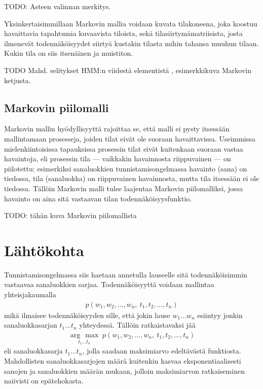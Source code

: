 \documentclass[utf8,bachelor,manualbib]{gradu3}
\newcommand{\argmax}[1]{\underset{#1}{\operatorname{arg}\,\operatorname{max}}\;}
\begin{document}
TODO: Asteen valinnan merkitys.

Yksinkertaisimmillaan Markovin mallia voidaan kuvata tilakoneena, joka koostuu havaittavia tapahtumia kuvaavista tiloista, sekä tilasiirtymämatriisista, josta ilmenevät todennäköisyydet siirtyä kustakin tilasta mihin tahansa muuhun tilaan. Kukin tila on siis itsenäinen ja muistiton.

TODO Mahd. selitykset HMM:n viidestä elementistä \citep{rabiner1989}, esimerkkikuva Markovin ketjusta.


\subsection{Markovin piilomalli}

Markovin mallin hyödyllisyyttä rajoittaa se, että malli ei pysty itsessään mallintamaan prosesseja, joiden tilat eivät ole suoraan havaittavissa. Useimmissa mielenkiintoisissa tapauksissa prosessin tilat eivät kuitenkaan suoraan vastaa havaintoja, eli prosessin tila --- vaikkakin havainnosta riippuvainen --- on piilotettu: esimerkiksi sanaluokkien tunnistamisongelmassa havainto (sana) on tiedossa, tila (sanaluokka) on riippuvainen havainnosta, mutta tila itsessään ei ole tiedossa. Tällöin Markovin malli tulee laajentaa Markovin piilomalliksi, jossa havainto on aina sitä vastaavan tilan todennäköisyysfunktio.

TODO: tähän kuva Markovin piilomallista


\section{Lähtökohta}

Tunnistamisongelmassa siis haetaan annetulla lauseelle sitä todennäköisimmin vastaavaa sanaluokkien sarjaa. Todennäköisyyttä voidaan mallintaa yhteisjakaumalla
\begin{align}
p(w_1, w_2, \ldots, w_n,\: t_1, t_2, \ldots, t_n)
\label{generativemodel}
\end{align}
mikä ilmaisee todennäköisyyden sille, että jokin lause $ w_1 \ldots w_n $ esiintyy jonkin sanaluokkasarjan $ t_1 \ldots t_n $ yhteydessä. Tällöin ratkaistavaksi jää
\begin{align}
\argmax{t_1 \ldots t_n} p(w_1, w_2, \ldots, w_n,\: t_1, t_2, \ldots, t_n)
\end{align}
eli sanaluokkasarja $ t_1 \ldots t_n $, jolla saadaan maksimiarvo edeltävästä funktiosta. Mahdollisten sanaluokkasarjojen määrä kuitenkin kasvaa eksponentiaalisesti sanojen ja sanaluokkien määrän mukaan, jolloin maksimiarvon ratkaiseminen naiivisti on epätehokasta.
\end{document}
